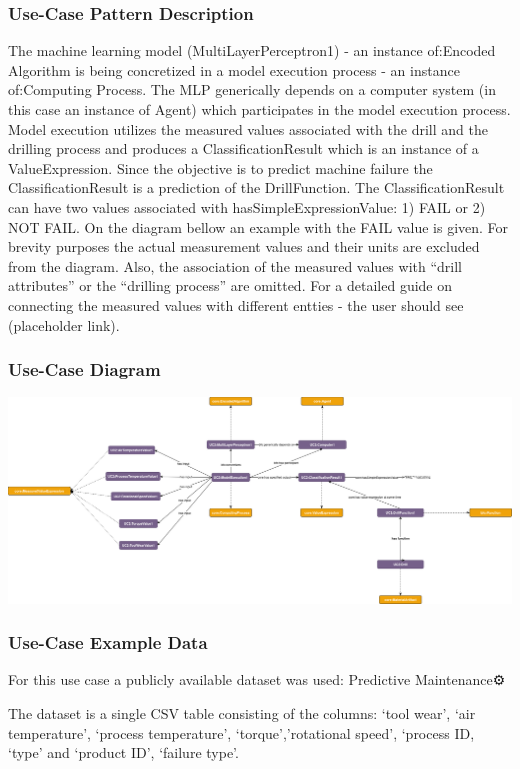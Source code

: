\subsubsection*{Use-Case Pattern Description}
The machine learning model (MultiLayerPerceptron1) - an instance of:Encoded Algorithm is being concretized in a model execution process - an instance of:Computing Process. The MLP generically depends on a computer system (in this case an instance of Agent) which participates in the model execution process. Model execution utilizes the measured values associated with the drill and the drilling process and produces a ClassificationResult which is an instance of a ValueExpression. Since the objective is to predict machine failure the ClassificationResult is a prediction of the DrillFunction. The ClassificationResult can have two values associated with hasSimpleExpressionValue: 1) FAIL or 2) NOT FAIL. On the diagram bellow an example with the FAIL value is given. For brevity purposes the actual measurement values and their units are excluded from the diagram. Also, the association of the measured values with “drill attributes” or the “drilling process” are omitted. For a detailed guide on connecting the measured values with different entties - the user should see (placeholder link).


\subsubsection*{Use-Case Diagram}
\includegraphics[scale=0.23]{scenarios/algorithm-execution/images/algorithm-execution-usecase1.png}

\subsubsection*{Use-Case Example Data}

For this use case a publicly available dataset was used: Predictive Maintenance⚙️ 

The dataset is a single CSV table consisting of the columns: ‘tool wear’, ‘air temperature’, ‘process temperature’, ‘torque’,’rotational speed’, ‘process ID, ‘type’ and ‘product ID’, ‘failure type’.

